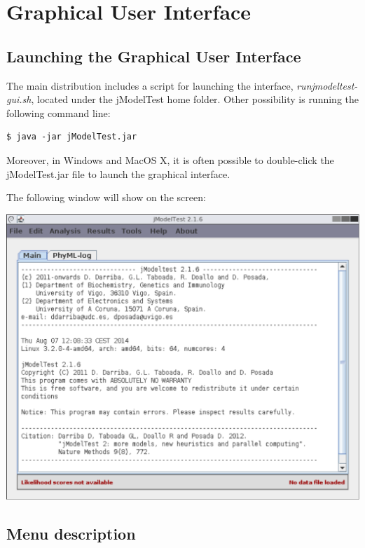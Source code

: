 \documentclass[11pt,twoside,a4paper]{article}
\begin{document}
\section{Graphical User Interface}
\label{sec:gui}

\subsection{Launching the Graphical User Interface}

The main distribution includes a script for launching the interface,  \emph{runjmodeltest-gui.sh}, located under the jModelTest home folder. Other possibility is running the following command line:

\begin{lstlisting}
$ java -jar jModelTest.jar
\end{lstlisting}

Moreover, in Windows and MacOS X, it is often possible to double-click the jModelTest.jar file to launch the graphical interface.

The following window will show on the screen:

\begin{center}
\includegraphics[width=.9\textwidth]{images/main-window}
\end{center}

\subsection{Menu description}
\end{document}
